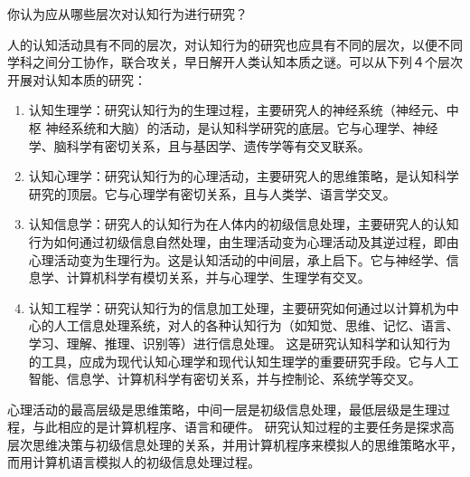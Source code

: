 \begin{question}
你认为应从哪些层次对认知行为进行研究？
\end{question}
\begin{solution}
人的认知活动具有不同的层次，对认知行为的研究也应具有不同的层次，以便不同学科之间分工协作，联合攻关，早日解开人类认知本质之谜。可以从下列４个层次开展对认知本质的研究： 
	\begin{enumerate}
		\item 认知生理学：研究认知行为的生理过程，主要研究人的神经系统（神经元、中枢 神经系统和大脑）的活动，是认知科学研究的底层。它与心理学、神经学、脑科学有密切关系，且与基因学、遗传学等有交叉联系。
		\item 认知心理学：研究认知行为的心理活动，主要研究人的思维策略，是认知科学研究的顶层。它与心理学有密切关系，且与人类学、语言学交叉。
		\item 认知信息学：研究人的认知行为在人体内的初级信息处理，主要研究人的认知行为如何通过初级信息自然处理，由生理活动变为心理活动及其逆过程，即由心理活动变为生理行为。这是认知活动的中间层，承上启下。它与神经学、信息学、计算机科学有模切关系，并与心理学、生理学有交叉。
		\item 认知工程学：研究认知行为的信息加工处理，主要研究如何通过以计算机为中心的人工信息处理系统，对人的各种认知行为（如知觉、思维、记忆、语言、学习、理解、推理、识别等）进行信息处理。 这是研究认知科学和认知行为的工具，应成为现代认知心理学和现代认知生理学的重要研究手段。它与人工智能、信息学、计算机科学有密切关系，并与控制论、系统学等交叉。
	\end{enumerate} \par
心理活动的最高层级是思维策略，中间一层是初级信息处理，最低层级是生理过程，与此相应的是计算机程序、语言和硬件。 研究认知过程的主要任务是探求高层次思维决策与初级信息处理的关系，并用计算机程序来模拟人的思维策略水平，而用计算机语言模拟人的初级信息处理过程。 
\end{solution}

